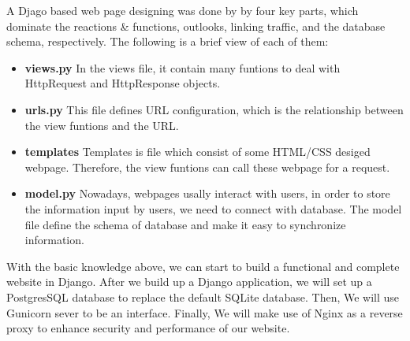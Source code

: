 A Djago based web page designing was done by by four key parts, which dominate the reactions 
\& functions, outlooks, linking traffic, and the database schema, respectively. 
The following is a brief view of each of them:
\begin{itemize}
	\item[] \textbf{views.py}
	In the views file, it contain many funtions to deal with HttpRequest and  HttpResponse objects.
	\item[] \textbf{urls.py}
	This file defines URL configuration, which is the relationship between the view funtions and the URL.
	\item[] \textbf{templates}
	Templates is file which consist of some HTML/CSS desiged webpage. Therefore, the view funtions can call these webpage for a request.
	\item[] \textbf{model.py}
	Nowadays, webpages usally interact with users, in order to store the information input by users, we need to connect with database. 
	The model file define the schema of database and make it easy to synchronize information.\\
\end{itemize}
With the basic knowledge above, we can start to build a functional and complete website in Django. 
After we build up a Django application, we will set up a PostgresSQL database to replace the default SQLite database. 
Then, We will use Gunicorn sever to be an interface. Finally, We will make use of Nginx as a reverse proxy to enhance security and performance of our website.
